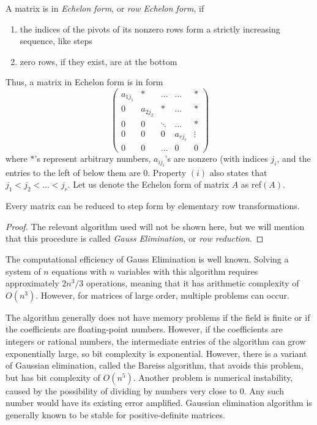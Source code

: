 \documentclass{article}
\begin{document}
    \begin{definition}
    A matrix is in \textit{Echelon form}, or \textit{row Echelon form}, if 
    \begin{enumerate}
        \item the indices of the pivots of its nonzero rows form a strictly increasing sequence, like steps
        \item zero rows, if they exist, are at the bottom
    \end{enumerate}
    Thus, a matrix in Echelon form is in form
    \[\begin{pmatrix}
    a_{1 j_1} & * & \ldots & \ldots & * \\
    0 & a_{2 j_2} & * & \ldots & * \\
    0& 0& \ddots & \ldots & * \\
    0& 0& 0& a_{r j_r} & \vdots \\
    0 & 0 & \ldots & 0 & 0
    \end{pmatrix}\]
    where $*$'s represent arbitrary numbers, $a_{i j_i}$'s are nonzero (with indices $j_i$, and the entries to the left of below them are $0$. Property $(i)$ also states that $j_1 < j_2 < ... < j_r$. Let us denote the Echelon form of matrix $A$ as ref$(A)$. 
    \end{definition}

    \begin{theorem}
    Every matrix can be reduced to step form by elementary row transformations. 
    \end{theorem}

    \begin{proof}
    The relevant algorithm used will not be shown here, but we will mention that this procedure is called \textit{Gauss Elimination}, or \textit{row reduction}. 
    \end{proof}

    The computational efficiency of Gauss Elimination is well known. Solving a system of $n$ equations with $n$ variables with this algorithm requires approximately $2 n^3 / 3$ operations, meaning that it has arithmetic complexity of $O(n^3)$. However, for matrices of large order, multiple problems can occur. 

    The algorithm generally does not have memory problems if the field is finite or if the coefficients are floating-point numbers. However, if the coefficients are integers or rational numbers, the intermediate entries of the algorithm can grow exponentially large, so bit complexity is exponential. However, there is a variant of Gaussian elimination, called the Bareiss algorithm, that avoids this problem, but has bit complexity of $O(n^5)$. Another problem is numerical instability, caused by the possibility of dividing by numbers very close to $0$. Any such number would have its existing error amplified. Gaussian elimination algorithm is generally known to be stable for positive-definite matrices. 
\end{document}
